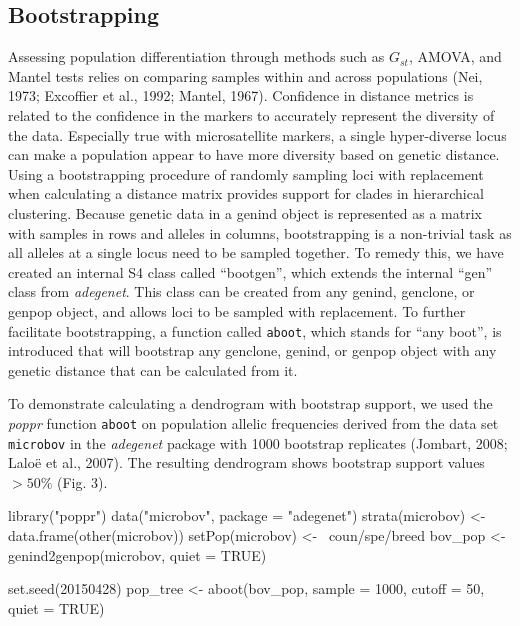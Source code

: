 \documentclass{frontiersSCNS} %
\newenvironment{CodeChunk}{}{}
\begin{document}
\subsection*{Bootstrapping}\label{bootstrapping}

Assessing population differentiation through methods such as \(G_{st}\),
AMOVA, and Mantel tests relies on comparing samples within and across
populations (Nei, 1973; Excoffier et al., 1992; Mantel, 1967).
Confidence in distance metrics is related to the confidence in the
markers to accurately represent the diversity of the data. Especially
true with microsatellite markers, a single hyper-diverse locus can make
a population appear to have more diversity based on genetic distance.
Using a bootstrapping procedure of randomly sampling loci with
replacement when calculating a distance matrix provides support for
clades in hierarchical clustering. Because genetic data in a genind
object is represented as a matrix with samples in rows and alleles in
columns, bootstrapping is a non-trivial task as all alleles at a single
locus need to be sampled together. To remedy this, we have created an
internal S4 class called ``bootgen'', which extends the internal ``gen''
class from \emph{adegenet}. This class can be created from any genind,
genclone, or genpop object, and allows loci to be sampled with
replacement. To further facilitate bootstrapping, a function called
\texttt{aboot}, which stands for ``any boot'', is introduced that will
bootstrap any genclone, genind, or genpop object with any genetic
distance that can be calculated from it.

To demonstrate calculating a dendrogram with bootstrap support, we used
the \emph{poppr} function \texttt{aboot} on population allelic
frequencies derived from the data set \texttt{microbov} in the
\emph{adegenet} package with 1000 bootstrap replicates (Jombart, 2008;
Lalo{ë} et al., 2007). The resulting dendrogram shows bootstrap support
values \(>50\%\) (Fig. 3).

\begin{CodeChunk}
\begin{CodeInput}
library("poppr")
data("microbov", package = "adegenet") 
strata(microbov) <- data.frame(other(microbov)) 
setPop(microbov) <- ~coun/spe/breed 
bov_pop <- genind2genpop(microbov, quiet = TRUE) 

set.seed(20150428)
pop_tree <- aboot(bov_pop, sample = 1000, cutoff = 50, quiet = TRUE)
\end{CodeInput}
\end{CodeChunk}
\end{document}
